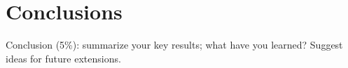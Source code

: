 \section{Conclusions}
Conclusion (5\%): summarize your key results; what have you learned? Suggest ideas for future extensions.
